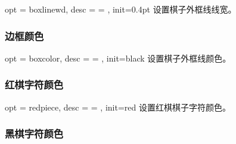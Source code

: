\documentclass[full]{l3doc}
\begin{document}
\begin{documentation}
\begin{option}{ opt = boxlinewd, desc = {= }, init=0.4pt }
  设置棋子外框线线宽。
\end{option}

\begin{SideBySideExample}[frame=single,numbers=left,
                xrightmargin=.60\linewidth,gobble=2]
  \centering
  \cchessboard[boxlinewd=0.8pt]
\end{SideBySideExample}

\bigskip

\subsubsection{边框颜色}

\begin{option}{ opt = boxcolor, desc = {= }, init=black }
  设置棋子外框线颜色。
\end{option}

\begin{SideBySideExample}[frame=single,numbers=left,
                xrightmargin=.60\linewidth,gobble=2]
  \centering
  \cchessboard[boxcolor=white]
\end{SideBySideExample}

\bigskip

\subsubsection{红棋字符颜色}

\begin{option}{ opt = redpiece, desc = {= }, init=red }
  设置红棋棋子字符颜色。
\end{option}

\begin{SideBySideExample}[frame=single,numbers=left,
                xrightmargin=.60\linewidth,gobble=2]
  \centering
  \cchessboard[redpiece=white]
\end{SideBySideExample}

\bigskip

\subsubsection{黑棋字符颜色}


\end{documentation}
\end{document}
